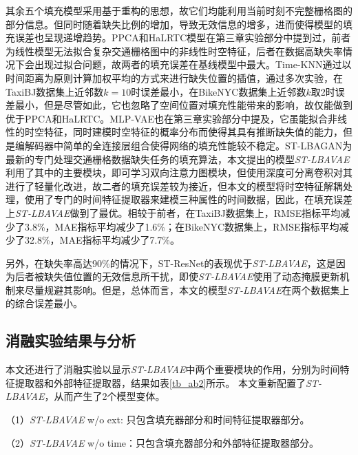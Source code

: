 其余五个填充模型采用基于重构的思想，故它们均能利用当前时刻不完整栅格图的部分信息。但同时随着缺失比例的增加，导致无效信息的增多，进而使得模型的填充误差也呈现递增趋势。PPCA和HaLRTC模型在第三章实验部分中提到过，前者为线性模型无法拟合复杂交通栅格图中的非线性时空特征，后者在数据高缺失率情况下会出现过拟合问题，故两者的填充误差在基线模型中最大。Time-KNN通过以时间距离为原则计算加权平均的方式来进行缺失位置的插值，通过多次实验，在TaxiBJ数据集上近邻数$k=10$时误差最小，在BikeNYC数据集上近邻数$k$取2时误差最小，但是尽管如此，它也忽略了空间位置对填充性能带来的影响，故仅能做到优于PPCA和HaLRTC。MLP-VAE也在第三章实验部分中提及，它虽能拟合非线性的时空特征，同时建模时空特征的概率分布而使得其具有推断缺失值的能力，但是编解码器中简单的全连接层组合使得网络的填充性能较不稳定。ST-LBAGAN为最新的专门处理交通栅格数据缺失任务的填充算法，本文提出的模型\textit{ST-LBAVAE}利用了其中的主要模块，即可学习双向注意力图模块，但使用深度可分离卷积对其进行了轻量化改进，故二者的填充误差较为接近，但本文的模型将时空特征解耦处理，使用了专门的时间特征提取器来建模三种属性的时间数据，因此，在填充误差上\textit{ST-LBAVAE}做到了最优。相较于前者，在TaxiBJ数据集上，RMSE指标平均减少了3.8\%，MAE指标平均减少了1.6\%；在BikeNYC数据集上，RMSE指标平均减少了32.8\%，MAE指标平均减少了7.7\%。

另外，在缺失率高达90\%的情况下，ST-ResNet的表现优于\textit{ST-LBAVAE}，这是因为后者被缺失值位置的无效信息所干扰，即使\textit{ST-LBAVAE}使用了动态掩膜更新机制来尽量规避其影响。但是，总体而言，本文的模型\textit{ST-LBAVAE}在两个数据集上的综合误差最小。

\subsection{消融实验结果与分析}
本文还进行了消融实验以显示\textit{ST-LBAVAE}中两个重要模块的作用，分别为时间特征提取器和外部特征提取器，结果如表\ref{tb_ab2}所示。
本文重新配置了\textit{ST-LBAVAE}，从而产生了2个模型变体。 

（1）\textit{ST-LBAVAE} w/o ext: 只包含填充器部分和时间特征提取器部分。

（2）\textit{ST-LBAVAE} w/o time：只包含填充器部分和外部特征提取器部分。 


